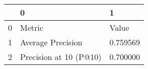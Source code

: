 \begin{tabular}{lll}
\toprule
 & 0 & 1 \\
\midrule
0 & Metric & Value \\
1 & Average Precision & 0.759569 \\
2 & Precision at 10 (P@10) & 0.700000 \\
\bottomrule
\end{tabular}
